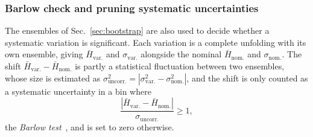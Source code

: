  \subsubsection{Barlow check and pruning systematic uncertainties}
 \label{sec:barlow}
 The ensembles of Sec.~\ref{sec:bootstrap} are also used to decide whether a systematic variation is significant. 
 Each variation is a complete unfolding with its own ensemble, giving \(\bar{H}_\mathrm{var.}\) and \(\sigma_\mathrm{var.}\) alongside the nominal \(\bar{H}_\mathrm{nom.}\) and \(\sigma_\mathrm{nom.}\). 
 The shift \(\bar{H}_\mathrm{var.} - \bar{H}_\mathrm{nom.}\) is partly a statistical fluctuation between two ensembles, whose size is estimated as \(\sigma^2_\mathrm{uncorr.} = |\sigma^2_\mathrm{var.} - \sigma^2_\mathrm{nom.}|\), and the shift is only counted as a systematic uncertainty in a bin where
 \begin{equation}
 	\label{eq:barlow}
 	\frac{|\bar{H}_\mathrm{var.} - \bar{H}_\mathrm{nom.}|}{\sigma_\mathrm{uncorr.}} \geq 1 ,
 \end{equation}
 the \emph{Barlow test}~\cite{Barlow:2002yb}, and is set to zero otherwise. 
 

